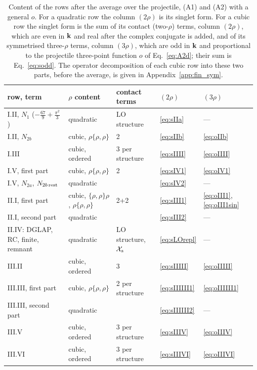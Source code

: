 \begin{table}[t]
\centering
\renewcommand{\arraystretch}{1.2}
\footnotesize\setlength{\tabcolsep}{4pt}
\begin{tabular}{@{}lllll@{}}
\toprule
row, term & $\rho$ content & contact terms & $(2\rho)$ & $(3\rho)$\\
\midrule
I.II, $N_1$ ($-\frac{67}{9}+\frac{\pi^2}{3}$) & quadratic & LO structure & \eqref{eq:sIIa} & ---\\
I.II, $N_{2b}$ & cubic, $\rho\{\rho,\rho\}$ & 2 & \eqref{eq:sIIb} & \eqref{eq:oIIb}\\
I.III & cubic, ordered & 3 per structure & \eqref{eq:sIIII} & \eqref{eq:oIIII}\\
I.V, first part & cubic, $\rho\{\rho,\rho\}$ & 2 & \eqref{eq:sIV1} & \eqref{eq:oIV1}\\
I.V, $N_{2a}$, $N_{2b\,\rm rest}$ & quadratic & & \eqref{eq:sIV2} & ---\\
II.I, first part & cubic, $\{\rho,\rho\}\rho$, $\rho\{\rho,\rho\}$ & 2+2 & \eqref{eq:sIII1} & \eqref{eq:oIII1}, \eqref{eq:oIII1sin}\\
II.I, second part & quadratic & & \eqref{eq:sIII2} & ---\\
II.IV: DGLAP, RC, finite, remnant & quadratic & LO structure, $\mathcal X_{\rm s}$ & \eqref{eq:sLOrepl} & ---\\
III.II & cubic, ordered & 3 & \eqref{eq:sIIIII} & \eqref{eq:oIIIII}\\
III.III, first part & cubic, $\rho\{\rho,\rho\}$ & 2 per structure & \eqref{eq:sIIIIII1} & \eqref{eq:oIIIIII1}\\
III.III, second part & quadratic & & \eqref{eq:sIIIIII2} & ---\\
III.V & cubic, ordered & 3 per structure & \eqref{eq:sIIIV} & \eqref{eq:oIIIV}\\
III.VI & cubic, ordered & 3 per structure & \eqref{eq:sIIIVI} & \eqref{eq:oIIIVI}\\
\bottomrule
\end{tabular}
\caption{Content of the rows after the average over the projectile, (A1) and (A2) with a general $o$. For a quadratic row the column $(2\rho)$ is its singlet form. For a cubic row the singlet form is the sum of its contact (two-$\rho$) terms, column $(2\rho)$, which are even in $\mathbf{k}$ and real after the complex conjugate is added, and of its symmetrised three-$\rho$ terms, column $(3\rho)$, which are odd in $\mathbf{k}$ and proportional to the projectile three-point function $o$ of Eq.~\eqref{eq:A2d}; their sum is Eq.~\eqref{eq:sodd}. The operator decomposition of each cubic row into these two parts, before the average, is given in Appendix~\ref{app:fin_sym}.}
\label{tab:singletrows}
\end{table}

